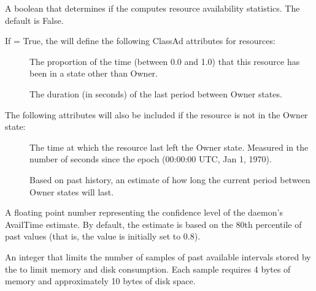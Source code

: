 \begin{description}

\label{param:StartdComputeAvailStats}
\item[\Macro{STARTD\_COMPUTE\_AVAIL\_STATS}]
  A boolean that determines if the  computes resource
  availability statistics.  The default is False.

If  = True, the  will
define the following ClassAd attributes for resources:

\begin{description}
\item[]
  The proportion of the time (between 0.0 and 1.0)
  that this resource has been in a state other than Owner.
\item[]
  The duration (in seconds) of the last period between Owner states.
\end{description}

The following attributes will also be included if the resource is
not in the Owner state:

\begin{description}
\item[]
  The time at which the resource last left the
  Owner state.  Measured in the number of seconds since the
  epoch (00:00:00 UTC, Jan 1, 1970).
\item[]
  Based on past history, an estimate
  of how long the current period between Owner states will last.
\end{description}

\label{param:StartdAvailConfidence}
\item[\Macro{STARTD\_AVAIL\_CONFIDENCE}]
  A floating point number representing the confidence level of the
   daemon's AvailTime estimate.
  By default, the estimate is based on
  the 80th percentile of past values
  (that is, the value is initially set to 0.8).

\label{param:StartdMaxAvailPeriodSamples}
\item[\Macro{STARTD\_MAX\_AVAIL\_PERIOD\_SAMPLES}]
  An integer that limits the number of samples of past available
  intervals stored by the  to limit memory and disk consumption.
  Each sample requires 4 bytes of memory and approximately 10 bytes of
  disk space.

\end{description}


